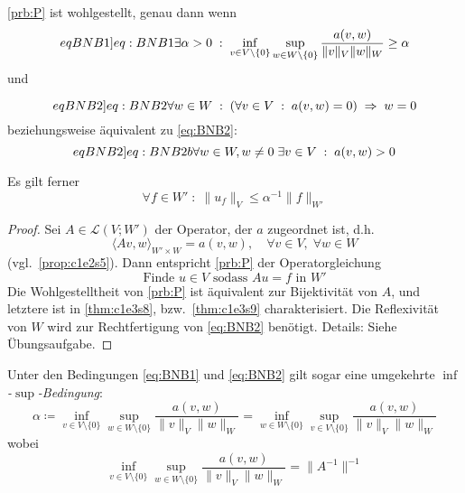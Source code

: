 \documentclass[../skript.tex]{subfiles}
\begin{document}
\begin{theorem} \label{thm:c1e4s2} %
	{
	\addtocounter{equation}{-1}
	\def\theequation{BNB 1}
	\cref{prb:P} ist wohlgestellt, genau dann wenn
	\begin{equation} %
	\label[eqBNB1]{eq:BNB1}
		\exists\alpha > 0 \; : \; \inf_{v\in V\setminus\{0\}} \sup_{w\in W\setminus\{0\}} \frac{a(v,w)}{\| v \|_V \| w \|_W} \geq\alpha
	\end{equation}
	und
	\addtocounter{equation}{-2}
	\def\theequation{BNB 2}
	\begin{equation} %
	\label[eqBNB2]{eq:BNB2}
		\forall w\in W \; : \; \left(\forall v\in V \; : \; a(v,w) = 0\right)\;\Rightarrow\;w=0
	\end{equation}
	beziehungsweise äquivalent zu \cref{eq:BNB2}:
	\begin{equation} %
	\label[eqBNB2]{eq:BNB2b}
		\forall w\in W, w \ne 0 \; \exists v\in V \; :\; a(v,w) > 0
	\end{equation}
	}
	Es gilt ferner
	\[
		\forall f\in W' \; :\; \| u_f \|_V \leq\alpha^{-1}\| f \|_{W'}
	\]
\end{theorem}

\begin{proof}
	Sei $A\in\mathcal{L}(V;W')$ der Operator, der $a$ zugeordnet ist, d.h.
	\[
		\langle Av, w \rangle_{W'\times W} = a(v,w),\quad\forall v\in V, \; \forall w\in W
	\]
	(vgl.\ \cref{prop:c1e2s5}). Dann entspricht \cref{prb:P} der Operatorgleichung
	\[
		\text{Finde }u\in V\text{ sodass } Au = f\text{ in } W'
	\]
	Die Wohlgestelltheit von \cref{prb:P} ist äquivalent zur Bijektivität von $A$, und letztere ist in \cref{thm:c1e3s8}, bzw.\ \cref{thm:c1e3s9} charakterisiert. Die Reflexivität von $W$ wird zur Rechtfertigung von \cref{eq:BNB2} benötigt. Details: Siehe Übungsaufgabe.
\end{proof}

\begin{remark} %
\label{bem:c1e4s3}
	Unter den Bedingungen \cref{eq:BNB1} und \cref{eq:BNB2} gilt sogar eine umgekehrte \emph{$\inf$-$\sup$-Bedingung}:
	\[
		\alpha \coloneqq \inf_{v\in V\setminus\{0\}}\sup_{w\in W\setminus\{0\}}\frac{a(v,w)}{\| v \|_V \| w \|_W} = \inf_{w\in W\setminus\{0\}}\sup_{v\in V\setminus\{0\}}\frac{a(v,w)}{\| v \|_V \| w \|_W}
	\]
	wobei 
	\[
		\inf_{v\in V\setminus\{0\}}\sup_{w\in W\setminus\{0\}}\frac{a(v,w)}{\| v \|_V \| w \|_W} = \| A^{-1} \| ^{-1}
	\]
\end{remark}
\end{document}
